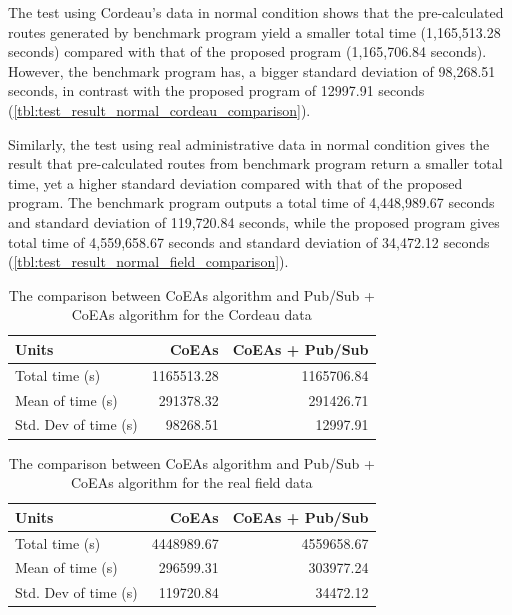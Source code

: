 \documentclass[conference]{IEEEtran}
\newcommand{\ra}[1]{\renewcommand{\arraystretch}{#1}}
\begin{document}
The test using Cordeau's data in normal condition shows that the pre-calculated routes generated by benchmark program yield a smaller total time (1,165,513.28 seconds) compared with that of the proposed program (1,165,706.84 seconds). However, the benchmark program has, a bigger standard deviation of 98,268.51 seconds, in contrast with the proposed program of 12997.91 seconds (\autoref{tbl:test_result_normal_cordeau_comparison}). 

Similarly, the test using real administrative data in normal condition gives the result that pre-calculated routes from benchmark program return a smaller total time, yet a higher standard deviation compared with that of the proposed program. The benchmark program outputs a total time of 4,448,989.67 seconds and standard deviation of 119,720.84 seconds, while the proposed program gives total time of 4,559,658.67 seconds and standard deviation of 34,472.12 seconds (\autoref{tbl:test_result_normal_field_comparison}).


\begin{table}
	\centering
	\ra{1.3}
	\caption{The comparison between CoEAs algorithm and Pub/Sub + CoEAs algorithm for the Cordeau data}
	\label{tbl:test_result_normal_cordeau_comparison}
	\begin{tabular}{lrr}
		\toprule
			Units & CoEAs & CoEAs + Pub/Sub\\ 
		\midrule
			Total time (s) & 1165513.28 & 1165706.84\\
			Mean of time (s) & 291378.32 & 291426.71\\
			Std. Dev of time (s) & 98268.51 & 12997.91\\
		\bottomrule
	\end{tabular}
\end{table}


\begin{table}
	\centering
	\ra{1.3}
	\caption{The comparison between CoEAs algorithm and Pub/Sub + CoEAs algorithm for the real field data}
	\label{tbl:test_result_normal_field_comparison}
	\begin{tabular}{lrr}
		\toprule
			Units & CoEAs & CoEAs + Pub/Sub\\ 
		\midrule
			Total time (s) & 4448989.67 & 4559658.67\\
			Mean of time (s) & 296599.31 & 303977.24\\
			Std. Dev of time (s) & 119720.84 & 34472.12\\
		\bottomrule
	\end{tabular}
\end{table}
\end{document}
